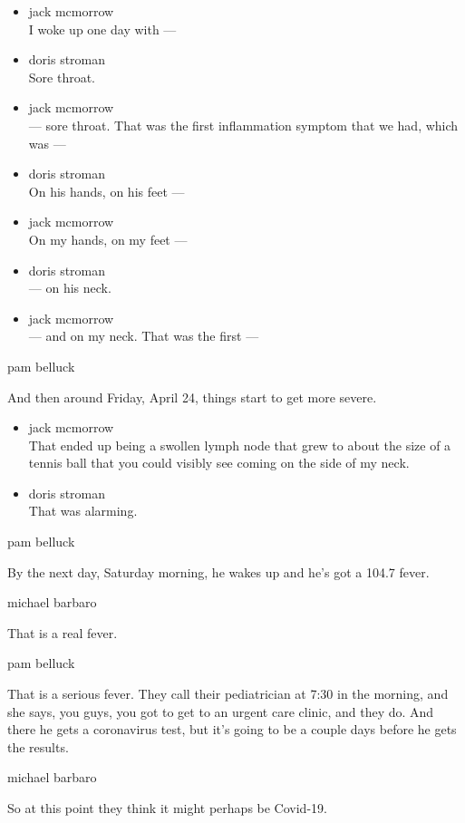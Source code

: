 \begin{itemize}
\item
  jack mcmorrow\\
  I woke up one day with ---
\item
  doris stroman\\
  Sore throat.
\item
  jack mcmorrow\\
  --- sore throat. That was the first inflammation symptom that we had,
  which was ---
\item
  doris stroman\\
  On his hands, on his feet ---
\item
  jack mcmorrow\\
  On my hands, on my feet ---
\item
  doris stroman\\
  --- on his neck.
\item
  jack mcmorrow\\
  --- and on my neck. That was the first ---
\end{itemize}

pam belluck

And then around Friday, April 24, things start to get more severe.

\begin{itemize}
\item
  jack mcmorrow\\
  That ended up being a swollen lymph node that grew to about the size
  of a tennis ball that you could visibly see coming on the side of my
  neck.
\item
  doris stroman\\
  That was alarming.
\end{itemize}

pam belluck

By the next day, Saturday morning, he wakes up and he's got a 104.7
fever.

michael barbaro

That is a real fever.

pam belluck

That is a serious fever. They call their pediatrician at 7:30 in the
morning, and she says, you guys, you got to get to an urgent care
clinic, and they do. And there he gets a coronavirus test, but it's
going to be a couple days before he gets the results.

michael barbaro

So at this point they think it might perhaps be Covid-19.

